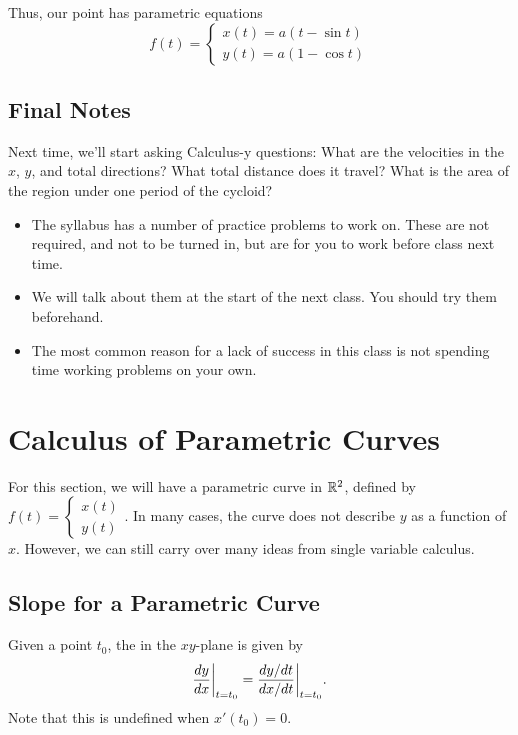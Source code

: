 Thus, our point has parametric equations
\[
    f(t) = \begin{cases}
        x(t) = a(t - \sin t) \\
        y(t) = a(1 - \cos t)
    \end{cases}
\]

\subsection{Final Notes}

Next time, we'll start asking Calculus-y questions: What are the velocities in the \(x\), \(y\), and total directions? What total distance does it travel? What is the area of the region under one period of the cycloid?
\begin{itemize}
    \item The syllabus has a number of practice problems to work on. These are not required, and not to be
          turned in, but are for you to work before class next time.
    \item We will talk about them at the start of the next class. You should try them beforehand.
    \item The most common reason for a lack of success in this class is not spending time working problems on
          your own.
\end{itemize}

\newpage

\section{Calculus of Parametric Curves}

For this section, we will have a parametric curve in \(\mathbb{R}^{2}\), defined by \(f(t) = \begin{cases}
    x(t) \\
    y(t)
\end{cases}.\) 
In many cases, the curve does not describe \(y\) as a function of \(x\). However, we can still carry over many ideas from single variable calculus.

\subsection{Slope for a Parametric Curve}

Given a point \(t_{0}\), the  in the \(xy\)-plane is given by
\[
    \frac{dy}{dx}\bigg|_{t = t_{0}} = \frac{dy/dt}{dx/dt}\bigg|_{t = t_{0}}. \\
\]
Note that this is undefined when \(x'(t_{0}) = 0\). \\

